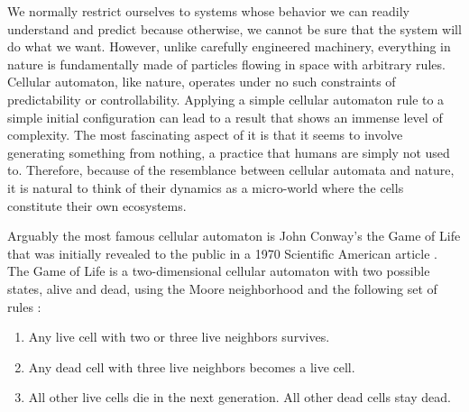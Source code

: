 \documentclass[12pt]{article}
\numberwithin{figure}{section} %
\begin{document}
We normally restrict ourselves to systems whose behavior we can readily understand and predict because otherwise, we cannot be sure that the system will do what we want. However, unlike carefully engineered machinery, everything in nature is fundamentally made of particles flowing in space with arbitrary rules. Cellular automaton, like nature, operates under no such constraints of predictability or controllability. Applying a simple cellular automaton rule to a simple initial configuration can lead to a result that shows an immense level of complexity. The most fascinating aspect of it is that it seems to involve generating something from nothing, a practice that humans are simply not used to. Therefore, because of the resemblance between cellular automata and nature, it is natural to think of their dynamics as a micro-world where the cells constitute their own ecosystems. 

Arguably the most famous cellular automaton is John Conway’s the Game of Life that was initially revealed to the public in a 1970 Scientific American article \cite{Scientific American}. The Game of Life is a two-dimensional cellular automaton with two possible states, alive and dead, using the Moore neighborhood and the following set of rules \cite{The Game of Life}: 
\begin{enumerate}[topsep=0pt,itemsep=-1ex,partopsep=1ex,parsep=1ex]
\item Any live cell with two or three live neighbors survives. 
\item Any dead cell with three live neighbors becomes a live cell. 
\item All other live cells die in the next generation. All other dead cells stay dead. 
\end{enumerate}
\end{document}
